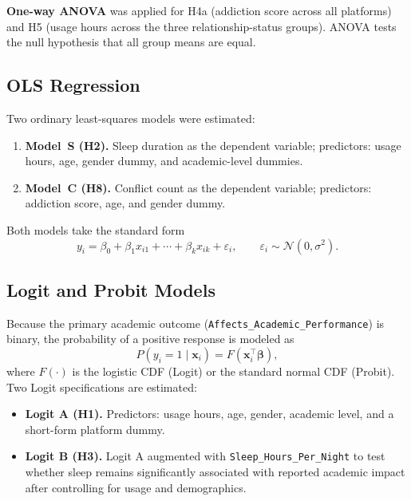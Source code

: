\documentclass[10pt]{article}
\begin{document}
\textbf{One-way ANOVA} was applied for H4a (addiction score across all
platforms) and H5 (usage hours across the three relationship-status groups).
ANOVA tests the null hypothesis that all group means are equal.

\subsection{OLS Regression}

Two ordinary least-squares models were estimated:

\begin{enumerate}
  \item \textbf{Model~S (H2).} Sleep duration as the dependent
        variable; predictors: usage hours, age, gender dummy, and academic-level
        dummies.
  \item \textbf{Model~C (H8).} Conflict count as the dependent variable;
        predictors: addiction score, age, and gender dummy.
\end{enumerate}

Both models take the standard form
\begin{equation}
  y_i = \beta_0 + \beta_1 x_{i1} + \cdots + \beta_k x_{ik} + \varepsilon_i,
  \qquad \varepsilon_i \sim \mathcal{N}(0,\sigma^2).
\end{equation}

\subsection{Logit and Probit Models}

Because the primary academic outcome (\texttt{Affects\_Academic\_Performance})
is binary, the probability of a positive response is modeled as
\begin{equation}
  P(y_i = 1 \mid \mathbf{x}_i) = F\!\left(\mathbf{x}_i^\top \boldsymbol{\beta}\right),
\end{equation}
where $F(\cdot)$ is the logistic CDF (Logit) or the standard normal CDF
(Probit). Two Logit specifications are estimated:

\begin{itemize}
  \item \textbf{Logit A (H1).} Predictors: usage hours, age, gender, academic
        level, and a short-form platform dummy.
  \item \textbf{Logit B (H3).} Logit A augmented with
        \texttt{Sleep\_Hours\_Per\_Night} to test whether sleep remains
        significantly associated with reported academic impact after controlling
        for usage and demographics.
\end{itemize}
\end{document}
